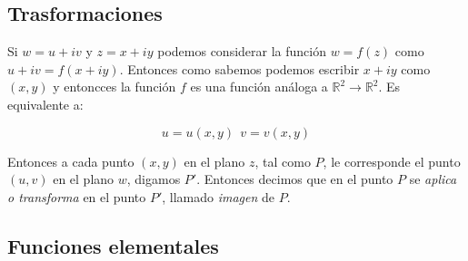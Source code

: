 \documentclass[12pt,a4paper]{book}
\begin{document}
\subsection{Trasformaciones}

Si $w = u +iv$ y $z = x+iy$ podemos considerar la función $w=f(z)$ como $u+iv = f(x+iy)$. Entonces como sabemos podemos escribir $x+iy $ como $(x,y)$ y entoncces la función $f$ es una función análoga a $\mathbb{R}^2 \rightarrow \mathbb{R}^2$. Es equivalente a:

\begin{equation}
u = u(x,y) \ \ v=v(x,y)
\end{equation}

Entonces a cada punto $(x,y)$ en el plano $z$, tal como $P$, le corresponde el punto $(u,v)$ en el plano $w$, digamos $P'$. Entonces decimos que en el punto $P$ se \textit{aplica o transforma} en el punto $P'$, llamado \textit{imagen} de $P$.

\subsection{Funciones elementales}
\end{document}
